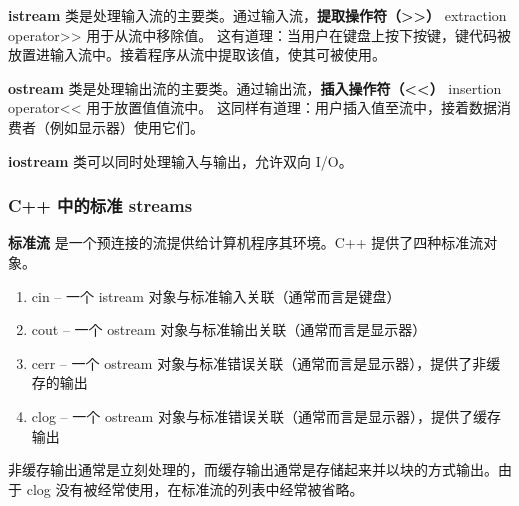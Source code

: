 \documentclass[../../LearnCpp.tex]{subfiles}
\begin{document}
\textbf{istream} 类是处理输入流的主要类。通过输入流，\textbf{提取操作符（>>）} extraction operator>> 用于从流中移除值。
这有道理：当用户在键盘上按下按键，键代码被放置进输入流中。接着程序从流中提取该值，使其可被使用。

\textbf{ostream} 类是处理输出流的主要类。通过输出流，\textbf{插入操作符（<<）} insertion operator<< 用于放置值值流中。
这同样有道理：用户插入值至流中，接着数据消费者（例如显示器）使用它们。

\textbf{iostream} 类可以同时处理输入与输出，允许双向 I/O。

\subsubsection*{C++ 中的标准 streams}

\textbf{标准流} 是一个预连接的流提供给计算机程序其环境。C++ 提供了四种标准流对象。

\begin{enumerate}
  \item cin -- 一个 istream 对象与标准输入关联（通常而言是键盘）
  \item cout -- 一个 ostream 对象与标准输出关联（通常而言是显示器）
  \item cerr -- 一个 ostream 对象与标准错误关联（通常而言是显示器），提供了非缓存的输出
  \item clog -- 一个 ostream 对象与标准错误关联（通常而言是显示器），提供了缓存输出
\end{enumerate}

非缓存输出通常是立刻处理的，而缓存输出通常是存储起来并以块的方式输出。由于 clog 没有被经常使用，在标准流的列表中经常被省略。
\end{document}
